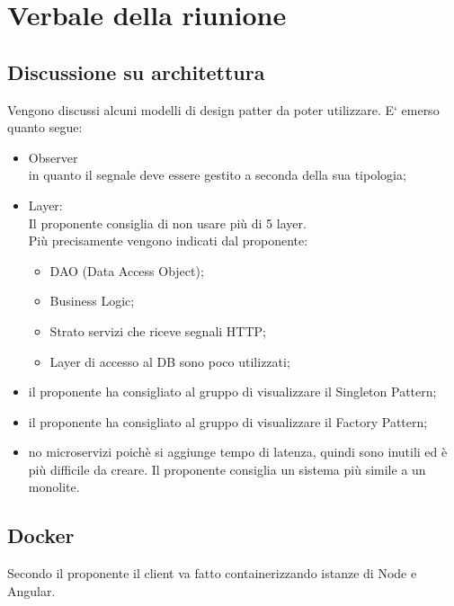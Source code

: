 \section{Verbale della riunione}

\subsection{Discussione su architettura}
Vengono discussi alcuni modelli di design patter da poter utilizzare. E` emerso quanto segue:
\begin{itemize}
\item Observer\\in quanto il segnale deve essere gestito a seconda della sua tipologia;
\item Layer: 
\\Il proponente consiglia di non usare più di 5 layer.\\Più precisamente vengono indicati dal proponente:
	\begin{itemize}
	\item DAO (Data Access Object);
	\item Business Logic;
	\item Strato servizi che riceve segnali HTTP;
	\item Layer di accesso al DB sono poco utilizzati;
	\end{itemize}
\item il proponente ha consigliato al gruppo di visualizzare il Singleton Pattern;
\item il proponente ha consigliato al gruppo di visualizzare il Factory Pattern;
\item no microservizi poichè si aggiunge tempo di latenza, quindi sono inutili ed è più difficile da creare. Il proponente consiglia un sistema più simile a un monolite.
\end{itemize}

\subsection{Docker}
Secondo il proponente il client va fatto containerizzando istanze di Node e Angular. 

